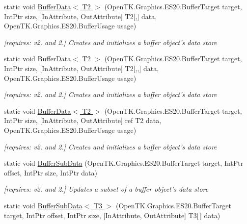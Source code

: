 \begin{DoxyCompactItemize}
static void \hyperlink{class_open_t_k_1_1_graphics_1_1_e_s20_1_1_g_l_a100cd4859879e7225bb816c6c86120cc}{Buffer\-Data$<$ T2 $>$} (Open\-T\-K.\-Graphics.\-E\-S20.\-Buffer\-Target target, Int\-Ptr size, \mbox{[}In\-Attribute, Out\-Attribute\mbox{]} T2\mbox{[},\mbox{]} data, Open\-T\-K.\-Graphics.\-E\-S20.\-Buffer\-Usage usage)
\begin{DoxyCompactList}\small\item\em \mbox{[}requires\-: v2. and 2.\mbox{]} Creates and initializes a buffer object's data store \end{DoxyCompactList}\item 
static void \hyperlink{class_open_t_k_1_1_graphics_1_1_e_s20_1_1_g_l_ae60d1b28e6908907fd5d5a0b843c7c48}{Buffer\-Data$<$ T2 $>$} (Open\-T\-K.\-Graphics.\-E\-S20.\-Buffer\-Target target, Int\-Ptr size, \mbox{[}In\-Attribute, Out\-Attribute\mbox{]} T2\mbox{[},,\mbox{]} data, Open\-T\-K.\-Graphics.\-E\-S20.\-Buffer\-Usage usage)
\begin{DoxyCompactList}\small\item\em \mbox{[}requires\-: v2. and 2.\mbox{]} Creates and initializes a buffer object's data store \end{DoxyCompactList}\item 
static void \hyperlink{class_open_t_k_1_1_graphics_1_1_e_s20_1_1_g_l_a72cfcfe7cd640b3bd25eaa89e4556e00}{Buffer\-Data$<$ T2 $>$} (Open\-T\-K.\-Graphics.\-E\-S20.\-Buffer\-Target target, Int\-Ptr size, \mbox{[}In\-Attribute, Out\-Attribute\mbox{]} ref T2 data, Open\-T\-K.\-Graphics.\-E\-S20.\-Buffer\-Usage usage)
\begin{DoxyCompactList}\small\item\em \mbox{[}requires\-: v2. and 2.\mbox{]} Creates and initializes a buffer object's data store \end{DoxyCompactList}\item 
static void \hyperlink{class_open_t_k_1_1_graphics_1_1_e_s20_1_1_g_l_ac660942c0a5c0e112ecb5a9f787ad103}{Buffer\-Sub\-Data} (Open\-T\-K.\-Graphics.\-E\-S20.\-Buffer\-Target target, Int\-Ptr offset, Int\-Ptr size, Int\-Ptr data)
\begin{DoxyCompactList}\small\item\em \mbox{[}requires\-: v2. and 2.\mbox{]} Updates a subset of a buffer object's data store \end{DoxyCompactList}\item 
static void \hyperlink{class_open_t_k_1_1_graphics_1_1_e_s20_1_1_g_l_a492952e56333c5d5228d68d6f3e19cd0}{Buffer\-Sub\-Data$<$ T3 $>$} (Open\-T\-K.\-Graphics.\-E\-S20.\-Buffer\-Target target, Int\-Ptr offset, Int\-Ptr size, \mbox{[}In\-Attribute, Out\-Attribute\mbox{]} T3\mbox{[}$\,$\mbox{]} data)

\end{DoxyCompactItemize}
